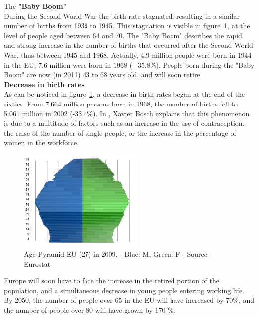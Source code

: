 The {\bf "Baby Boom"}\\
During the Second World War the birth rate stagnated, resulting in a similar number of births from 1939 to 1945. This stagnation is visible in figure~\ref{fig:agePyramidEU272009}, at the level of people aged between 64 and 70. The "Baby Boom" describes the rapid and strong increase in the number of births that occurred after the Second World War, thus between 1945 and 1968. Actually, 4.9 million people were born in 1944 in the EU, 7.6 million were born in 1968 (+35.8\%). People born during the "Baby Boom" are now (in 2011) 43 to 68 years old, and will soon retire.\\

{\bf Decrease in birth rates}\\
As can be noticed in figure~\ref{fig:agePyramidEU272009}, a decrease in birth rates began at the end of the sixties. From 7.664 million persons born in 1968, the number of births fell to 5.061 million in 2002 (-33.4\%). In \cite{Bosch:1998}, Xavier Bosch explains that this phenomenon is due to a multitude of factors such as an increase in the use of contraception, the raise of the number of single people, or the increase in the percentage of women in the workforce.\\

\begin{figure}
  \centering
  \includegraphics[width=60mm]{part1/pics/AgePyramidEU272009.pdf}
  \vspace{-0.8cm}
  \caption{Age Pyramid EU (27) in 2009. - Blue: M, Green: F - Source Eurostat}
  \label{fig:agePyramidEU272009}
	\vspace{-0.5cm}  
\end{figure}

Europe will soon have to face the increase in the retired portion of the population, and a simultaneous decrease in young people entering working life. By 2050, the number of people over 65 in the EU will have increased by 70\%, and the number of people over 80 will have grown by 170 \%.\\

